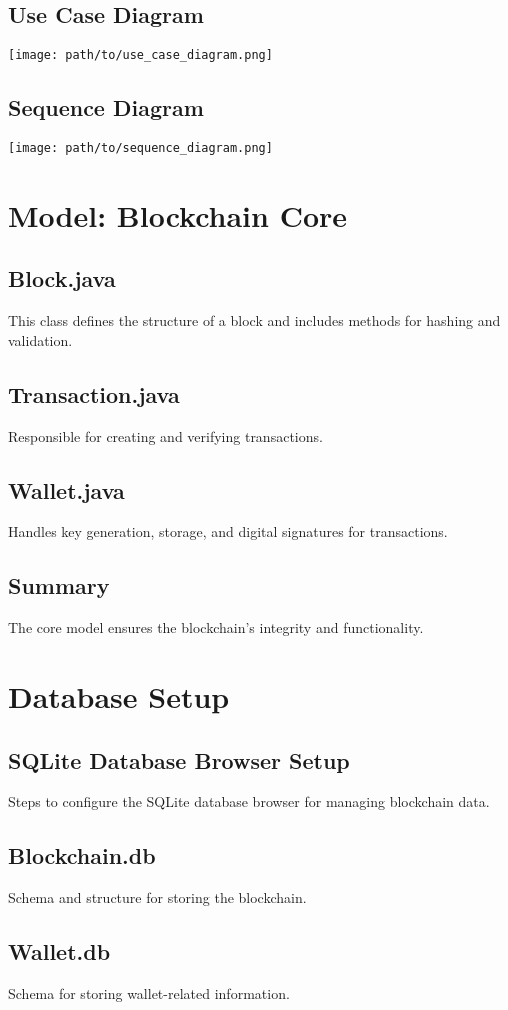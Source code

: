 \documentclass[12pt,a4paper]{report}
\begin{document}
\section{Use Case Diagram}
\texttt{[image: path/to/use\_case\_diagram.png]}

\section{Sequence Diagram}
\texttt{[image: path/to/sequence\_diagram.png]}

\chapter{Model: Blockchain Core}
\section{Block.java}
This class defines the structure of a block and includes methods for hashing and validation.
\section{Transaction.java}
Responsible for creating and verifying transactions.
\section{Wallet.java}
Handles key generation, storage, and digital signatures for transactions.
\section{Summary}
The core model ensures the blockchain's integrity and functionality.

\chapter{Database Setup}
\section{SQLite Database Browser Setup}
Steps to configure the SQLite database browser for managing blockchain data.
\section{Blockchain.db}
Schema and structure for storing the blockchain.
\section{Wallet.db}
Schema for storing wallet-related information.
\end{document}
